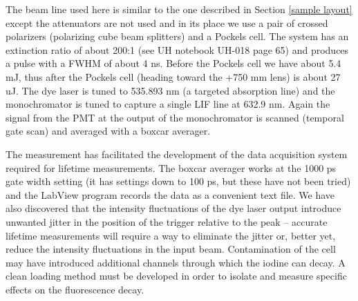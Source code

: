 The beam line used here is similar to the one described in Section \ref{sample layout} except the attenuators are not used and in its place we use a pair of crossed polarizers (polarizing cube beam splitters) and a Pockels cell. The system has an extinction ratio of about 200:1 (see UH notebook UH-018 page 65) and produces a pulse with a FWHM of about 4 ns. Before the Pockels cell we have about 5.4 mJ, thus after the Pockels cell (heading toward the +750 mm lens) is about 27 uJ. The dye laser is tuned to 535.893 nm (a targeted absorption line) and the monochromator is tuned to capture a single LIF line at 632.9 nm. Again the signal from the PMT at the output of the monochromator is scanned (temporal gate scan) and averaged with a boxcar averager.

The measurement has facilitated the development of the data acquisition system required for lifetime measurements. The boxcar averager works at the 1000 ps gate width setting (it has settings down to 100 ps, but these have not been tried) and the LabView program records the data as a convenient text file. We have also discovered that the intensity fluctuations of the dye laser output introduce unwanted jitter in the position of the trigger relative to the peak -- accurate lifetime measurements will require a way to eliminate the jitter or, better yet, reduce the intensity fluctuations in the input beam. Contamination of the cell may have introduced additional channels through which the iodine can decay. A clean loading method must be developed in order to isolate and measure specific effects on the fluorescence decay.
